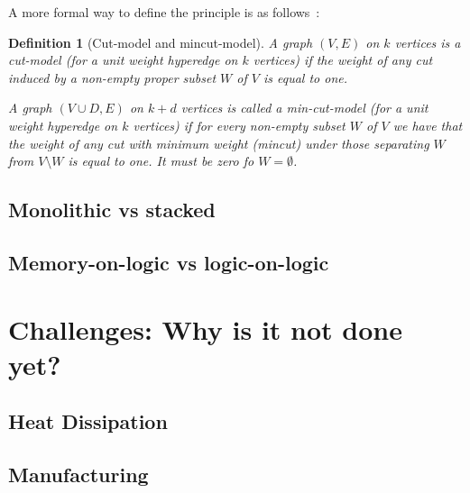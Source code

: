 \documentclass[11pt,a4paper]{article}
\theoremstyle{customdef}
\newtheorem{definition}{Definition}
\begin{document}
A more formal way to define the principle is as follows~:
\begin{definition}[Cut-model and mincut-model]\label{def:cut-model-formal}
A graph $(V, E)$ on $k$ vertices is a cut-model (for a unit weight hyperedge on $k$ vertices) if the weight of any cut induced by a non-empty proper subset $W$ of $V$ is equal to one.

A graph $(V \cup D,E)$ on $k+d$ vertices is called a min-cut-model (for a unit weight hyperedge on $k$ vertices) if for every non-empty subset $W$ of $V$ we have that the weight of any cut with minimum weight (mincut) under those separating $W$ from $V \setminus W$ is equal to one.
It must be zero fo $W=\emptyset$.%
\end{definition}

\subsection{Monolithic vs stacked}
\subsection{Memory-on-logic vs logic-on-logic}





\section{Challenges: Why is it not done yet?}
\subsection{Heat Dissipation}
\subsection{Manufacturing}
\end{document}
